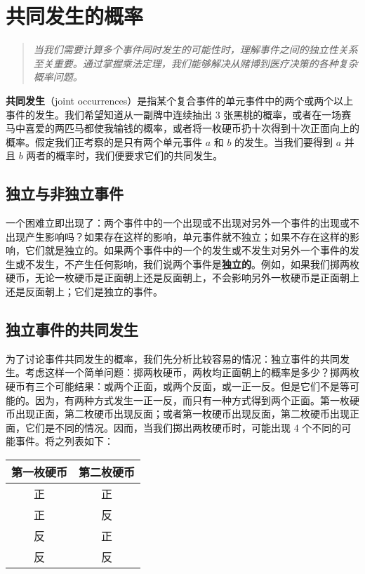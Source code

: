 \section{共同发生的概率}

\begin{quotation}
\textit{当我们需要计算多个事件同时发生的可能性时，理解事件之间的独立性关系至关重要。通过掌握乘法定理，我们能够解决从赌博到医疗决策的各种复杂概率问题。}
\end{quotation}

\textbf{共同发生}（joint occurrences）是指某个复合事件的单元事件中的两个或两个以上事件的发生。我们希望知道从一副牌中连续抽出 3 张黑桃的概率，或者在一场赛马中喜爱的两匹马都使我输钱的概率，或者将一枚硬币扔十次得到十次正面向上的概率。假定我们正考察的是只有两个单元事件 $a$ 和 $b$ 的发生。当我们要得到 $a$ 并且 $b$ 两者的概率时，我们便要求它们的共同发生。

\subsection{独立与非独立事件}

一个困难立即出现了：两个事件中的一个出现或不出现对另外一个事件的出现或不出现产生影响吗？如果存在这样的影响，单元事件就不独立；如果不存在这样的影响，它们就是独立的。如果两个事件中的一个的发生或不发生对另外一个事件的发生或不发生，不产生任何影响，我们说两个事件是\textbf{独立的}。例如，如果我们掷两枚硬币，无论一枚硬币是正面朝上还是反面朝上，不会影响另外一枚硬币是正面朝上还是反面朝上；它们是独立的事件。

\subsection{独立事件的共同发生}

为了讨论事件共同发生的概率，我们先分析比较容易的情况：独立事件的共同发生。考虑这样一个简单问题：掷两枚硬币，两枚均正面朝上的概率是多少？掷两枚硬币有三个可能结果：或两个正面，或两个反面，或一正一反。但是它们不是等可能的。因为，有两种方式发生一正一反，而只有一种方式得到两个正面。第一枚硬币出现正面，第二枚硬币出现反面；或者第一枚硬币出现反面，第二枚硬币出现正面，它们是不同的情况。因而，当我们掷出两枚硬币时，可能出现 4 个不同的可能事件。将之列表如下：

\begin{center}
\begin{tabular}{|c|c|}
\hline
\textbf{第一枚硬币} & \textbf{第二枚硬币} \\
\hline
正 & 正 \\
正 & 反 \\
反 & 正 \\
反 & 反 \\
\hline
\end{tabular}
\end{center}


